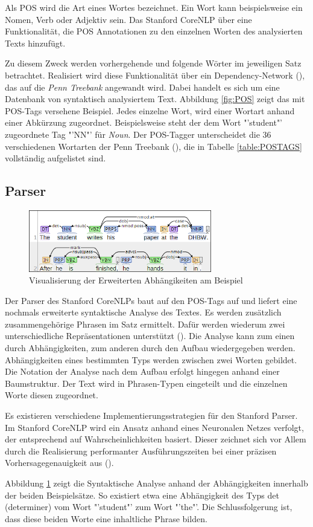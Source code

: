 Als \ac{POS} wird die Art eines Wortes bezeichnet. Ein Wort kann beispielsweise ein Nomen, Verb oder Adjektiv sein. Das Stanford CoreNLP über eine Funktionalität, die \ac{POS} Annotationen zu den einzelnen Worten des analysierten Texts hinzufügt.\par
Zu diesem Zweck werden vorhergehende und folgende Wörter im jeweiligen Satz betrachtet. Realisiert wird diese Funktionalität über ein Dependency-Network (\cite[vgl.][1]{POSTAGGER}), das auf die \textit{Penn Treebank} angewandt wird. Dabei handelt es sich um eine Datenbank von syntaktisch analysiertem Text. Abbildung \ref{fig:POS} zeigt das mit POS-Tags versehene Beispiel. Jedes einzelne Wort, wird einer Wortart anhand einer Abkürzung zugeordnet. Beispielsweise steht der dem Wort "'student"' zugeordnete Tag "'NN"' für \textit{Noun}. Der POS-Tagger unterscheidet die 36 verschiedenen Wortarten der Penn Treebank (\cite[vgl.][3]{PENNTREEBANK}), die in Tabelle \ref{table:POSTAGS} vollständig aufgelistet sind.

\subsection{Parser}
\label{subsec:parser}
\begin{figure}
\includegraphics[width=8cm]{pictures/Parser.png}
\caption{Visualisierung der Erweiterten Abhängikeiten am Beispiel}
\label{fig:ENHDEPS}
\end{figure}
Der Parser des Stanford CoreNLPs baut auf den POS-Tags auf und liefert eine nochmals erweiterte syntaktische Analyse des Textes. Es werden zusätzlich zusammengehörige Phrasen im Satz ermittelt. Dafür werden wiederum zwei unterschiedliche Repräsentationen unterstützt (\cite[vgl.][4]{STANFORDNLP}). Die Analyse kann zum einen durch Abhängigkeiten, zum anderen durch den Aufbau wiedergegeben werden. Abhängigkeiten eines bestimmten Typs werden zwischen zwei Worten gebildet. Die Notation der Analyse nach dem Aufbau erfolgt hingegen anhand einer Baumstruktur. Der Text wird in Phrasen-Typen eingeteilt und die einzelnen Worte diesen zugeordnet.\par Es existieren verschiedene Implementierungsstrategien für den Stanford Parser. Im Stanford CoreNLP wird ein Ansatz anhand eines Neuronalen Netzes verfolgt, der entsprechend auf Wahrscheinlichkeiten basiert. Dieser zeichnet sich vor Allem durch die Realisierung performanter Ausführungszeiten bei einer präzisen Vorhersagegenauigkeit aus (\cite[vgl.][8]{DEPPARSER}).\par
Abbildung \ref{fig:ENHDEPS} zeigt die Syntaktische Analyse anhand der Abhängigkeiten innerhalb der beiden Beispielsätze. So existiert etwa eine Abhängigkeit des Typs det (determiner) vom Wort "'student"' zum Wort "'the"'. Die Schlussfolgerung ist, dass diese beiden Worte eine inhaltliche Phrase bilden.

